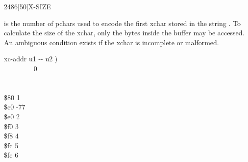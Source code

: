 \begin{worddef}{2486}[50]{X-SIZE}
\item {}

	 is the number of pchars used to encode the first xchar
	stored in the string .  To calculate the size of
	the xchar, only the bytes inside the buffer may be accessed.  An
	ambiguous condition exists if the xchar is incomplete or malformed.

	\begin{implement}
	\word{:}   xc-addr u1 -{}- u2 ) \\
	\tab {} ~~~~~~~~  0   \\
	\tab {}  \\
	\tab {} \\
	\tab {} \$80    1   \\
	\tab {} \$c0   -77  ~~ \\
	\tab {} \$e0    2   \\
	\tab {} \$f0    3   \\
	\tab {} \$f8    4   \\
	\tab {} \$fc    5   \\
	\tab {} \$fe    6   \\
	  \word{;}
	\end{implement}
\end{worddef}


